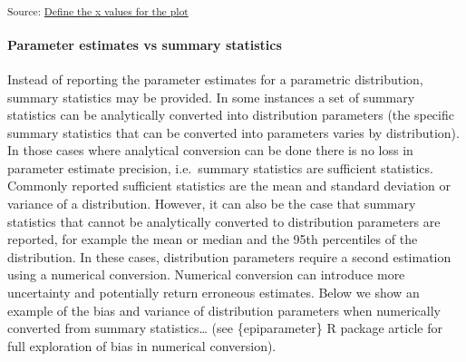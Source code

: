 \documentclass[
  10pt,
  letterpaper,
]{article}
\begin{document}
\begin{figure}[H]
{{}

\subcaption{\label{fig-dist-params-2}}

}

\caption{\label{fig-dist-params}}

\end{figure}%

\textsubscript{Source:
\href{https://joshwlambert.github.io/epiparameterReportingGuidance/use_cases/dist_params-preview.html\#cell-fig-dist-params}{Define
the x values for the plot}}

\paragraph{Parameter estimates vs summary
statistics}\label{parameter-estimates-vs-summary-statistics}

Instead of reporting the parameter estimates for a parametric
distribution, summary statistics may be provided. In some instances a
set of summary statistics can be analytically converted into
distribution parameters (the specific summary statistics that can be
converted into parameters varies by distribution). In those cases where
analytical conversion can be done there is no loss in parameter estimate
precision, i.e.~summary statistics are sufficient statistics. Commonly
reported sufficient statistics are the mean and standard deviation or
variance of a distribution. However, it can also be the case that
summary statistics that cannot be analytically converted to distribution
parameters are reported, for example the mean or median and the 95th
percentiles of the distribution. In these cases, distribution parameters
require a second estimation using a numerical conversion. Numerical
conversion can introduce more uncertainty and potentially return
erroneous estimates. Below we show an example of the bias and variance
of distribution parameters when numerically converted from summary
statistics\ldots{} (see \{epiparameter\} R package article for full
exploration of bias in numerical conversion).
\end{document}
